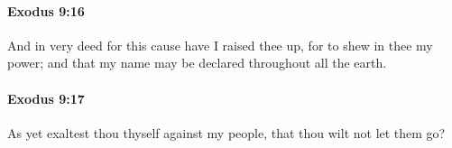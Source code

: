 		\paragraph{Exodus 9:16} %
			\label{EXODUS-9-16}

			And in very deed for this cause have I raised thee up, for to shew in thee my power; and that my name may be declared throughout all the earth.


		\paragraph{Exodus 9:17} %
			\label{EXODUS-9-17}

			As yet exaltest thou thyself against my people, that thou wilt not let them go?


